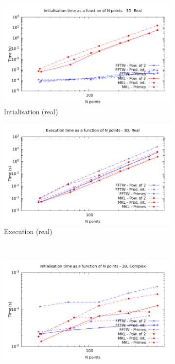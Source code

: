 \documentclass[12pt, a4paper]{article}
\begin{document}
\begin{figure}[H]
\captionsetup{width=0.8\linewidth}
\centering
\begin{subfigure}{.5\textwidth}
\centering
\includegraphics[width=.9\linewidth]{graphs/3d-init-r.pdf}
\caption{Intialisation (real)}
\label{3DRI}
\end{subfigure}%
\begin{subfigure}{.5\textwidth}
\centering
\includegraphics[width=.9\linewidth]{graphs/3d-exec-r.pdf}
\caption{Execution (real)}
\label{3DR}
\end{subfigure}\\
\begin{subfigure}{.5\textwidth}
\centering
\includegraphics[width=.9\linewidth]{graphs/3d-init-c.pdf}

\end{subfigure}
\end{figure}
\end{document}

